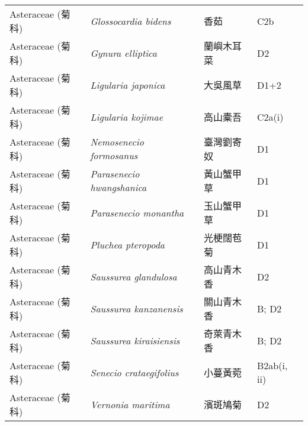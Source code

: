 \begin{longtable}{p{3cm}p{5cm}p{3cm}p{4cm}}
    Asteraceae (菊科) & \textit{Glossocardia bidens}  & 香茹 & C2b \index{Glossocardia@\textit{Glossocardia}!bidens@\textit{bidens}}  \index{香茹} \\
    Asteraceae (菊科) & \textit{Gynura elliptica}  & 蘭嶼木耳菜 & D2 \index{Gynura@\textit{Gynura}!elliptica@\textit{elliptica}}  \index{蘭嶼木耳菜} \\
    Asteraceae (菊科) & \textit{Ligularia japonica}  & 大吳風草 & D1+2 \index{Ligularia@\textit{Ligularia}!japonica@\textit{japonica}}  \index{大吳風草} \\
    Asteraceae (菊科) & \textit{Ligularia kojimae}  & 高山橐吾 & C2a(i) \index{Ligularia@\textit{Ligularia}!kojimae@\textit{kojimae}}  \index{高山橐吾} \\
    Asteraceae (菊科) & \textit{Nemosenecio formosanus}  & 臺灣劉寄奴 & D1 \index{Nemosenecio@\textit{Nemosenecio}!formosanus@\textit{formosanus}}  \index{臺灣劉寄奴} \\
    Asteraceae (菊科) & \textit{Parasenecio hwangshanica}  & 黃山蟹甲草 & D1 \index{Parasenecio@\textit{Parasenecio}!hwangshanica@\textit{hwangshanica}}  \index{黃山蟹甲草} \\
    Asteraceae (菊科) & \textit{Parasenecio monantha}  & 玉山蟹甲草 & D1 \index{Parasenecio@\textit{Parasenecio}!monantha@\textit{monantha}}  \index{玉山蟹甲草} \\
    Asteraceae (菊科) & \textit{Pluchea pteropoda}  & 光梗闊苞菊 & D1 \index{Pluchea@\textit{Pluchea}!pteropoda@\textit{pteropoda}}  \index{光梗闊苞菊} \\
    Asteraceae (菊科) & \textit{Saussurea glandulosa}  & 高山青木香 & D2 \index{Saussurea@\textit{Saussurea}!glandulosa@\textit{glandulosa}}  \index{高山青木香} \\
    Asteraceae (菊科) & \textit{Saussurea kanzanensis}  & 關山青木香 & B; D2 \index{Saussurea@\textit{Saussurea}!kanzanensis@\textit{kanzanensis}}  \index{關山青木香} \\
    Asteraceae (菊科) & \textit{Saussurea kiraisiensis}  & 奇萊青木香 & B; D2 \index{Saussurea@\textit{Saussurea}!kiraisiensis@\textit{kiraisiensis}}  \index{奇萊青木香} \\
    Asteraceae (菊科) & \textit{Senecio crataegifolius}  & 小蔓黃菀 & B2ab(i, ii) \index{Senecio@\textit{Senecio}!crataegifolius@\textit{crataegifolius}}  \index{小蔓黃菀} \\
    Asteraceae (菊科) & \textit{Vernonia maritima}  & 濱斑鳩菊 & D2 \index{Vernonia@\textit{Vernonia}!maritima@\textit{maritima}}  \index{濱斑鳩菊} \\

\end{longtable}

